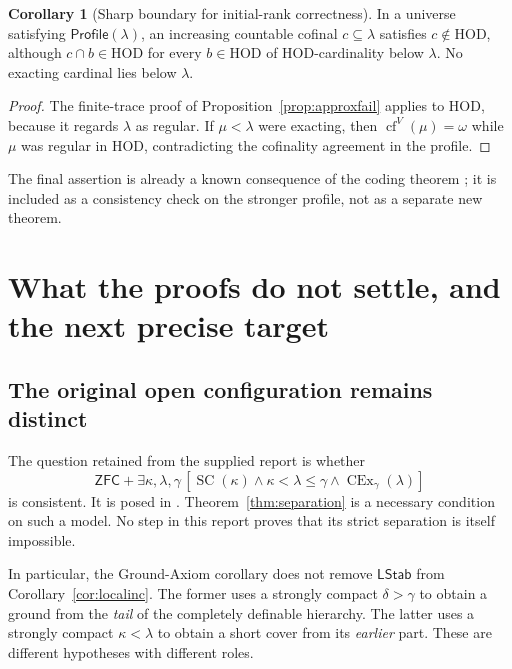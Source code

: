\documentclass[11pt,letterpaper]{article}
\theoremstyle{definition}
\newtheorem{corollary}[definition]{Corollary}
\newcommand{\ZFC}{\mathsf{ZFC}}
\newcommand{\HOD}{\mathrm{HOD}}
\newcommand{\SC}{\operatorname{SC}}
\newcommand{\CEx}{\operatorname{CEx}}
\newcommand{\cf}{\operatorname{cf}}
\newcommand{\LStab}{\mathsf{LStab}}
\newcommand{\Profile}{\mathsf{Profile}}
\begin{document}
\begin{corollary}[Sharp boundary for initial-rank correctness]\label{cor:profileapprox}
In a universe satisfying $\Profile(\lambda)$, an increasing countable cofinal $c\subseteq\lambda$ satisfies $c\notin\HOD$, although $c\cap b\in\HOD$ for every $b\in\HOD$ of HOD-cardinality below $\lambda$. No exacting cardinal lies below $\lambda$.
\end{corollary}

\begin{proof}
The finite-trace proof of Proposition~\ref{prop:approxfail} applies to $\HOD$, because it regards $\lambda$ as regular. If $\mu<\lambda$ were exacting, then $\cf^V(\mu)=\omega$ while $\mu$ was regular in $\HOD$, contradicting the cofinality agreement in the profile.
\end{proof}

The final assertion is already a known consequence of the coding theorem \cite[Corollary 3.10]{abgl}; it is included as a consistency check on the stronger profile, not as a separate new theorem.

\section{What the proofs do not settle, and the next precise target}\label{sec:limits}

\subsection{The original open configuration remains distinct}

The question retained from the supplied report is whether
\begin{equation}\label{eq:open}
   \ZFC+\exists\kappa,\lambda,\gamma\,
       [\SC(\kappa)\wedge\kappa<\lambda\leq\gamma
                         \wedge\CEx_\gamma(\lambda)]
\end{equation}
is consistent. It is posed in \cite[Problem 5.2]{cover}. Theorem~\ref{thm:separation} is a necessary condition on such a model. No step in this report proves that its strict separation is itself impossible.

In particular, the Ground-Axiom corollary does not remove $\LStab$ from Corollary~\ref{cor:localinc}. The former uses a strongly compact $\delta>\gamma$ to obtain a ground from the \emph{tail} of the completely definable hierarchy. The latter uses a strongly compact $\kappa<\lambda$ to obtain a short cover from its \emph{earlier} part. These are different hypotheses with different roles.
\end{document}
